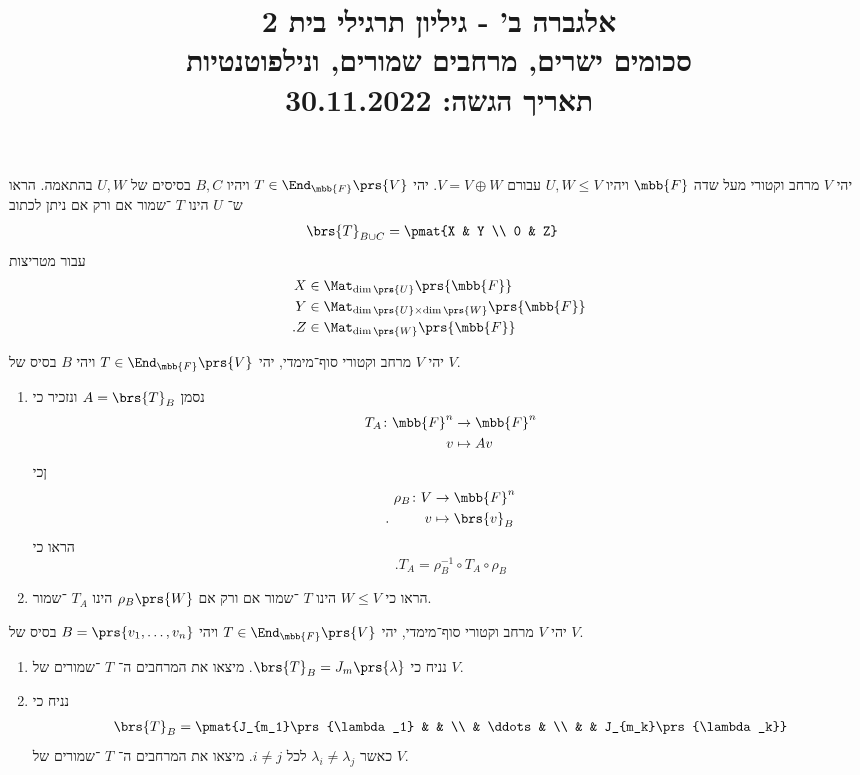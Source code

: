 \documentclass[a4paper,10pt,twoside,openany]{article}
\title{
אלגברה ב' - גיליון תרגילי בית 2 \\
סכומים ישרים, מרחבים שמורים, ונילפוטנטיות
\\
\vspace{1cm}
\large{תאריך הגשה: 30.11.2022}
}
\date{}
\begin{document}
\maketitle

\begin{exercise}
יהי
$V$
מרחב וקטורי מעל שדה
$\mbb{F}$
ויהיו
$U,W \leq V$
עבורם
$V = V \oplus W$.
יהי
$T \in \End_{\mbb{F}}\prs{V}$
ויהיו
$B,C$
בסיסים של
$U,W$
בהתאמה.
הראו ש־%
$U$
הינו
$T$%
־שמור אם ורק אם ניתן לכתוב
\begin{align*}
\brs{T}_{B \cup C} &= \pmat{X & Y \\ 0 & Z}
\end{align*}
עבור מטריצות
\begin{align*}
X &\in \Mat_{\dim\prs{U}}\prs{\mbb{F}} \\
Y &\in \Mat_{\dim\prs{U} \times \dim\prs{W}}\prs{\mbb{F}} \\
\text{.} Z &\in \Mat_{\dim\prs{W}}\prs{\mbb{F}}
\end{align*}
\end{exercise}

\begin{exercise}
יהי
$V$
מרחב וקטורי סוף־מימדי, יהי
$T \in \End_{\mbb{F}}\prs{V}$
ויהי
$B$
בסיס של
$V$.

\begin{enumerate}
\item נסמן
$A = \brs{T}_B$
ונזכיר כי
\begin{align*}
T_A \colon \mbb{F}^n &\to \mbb{F}^n \\
v &\mapsto Av
\end{align*}
ןכי
\begin{align*}
\rho_B \colon V &\to \mbb{F}^n \\
\text{.} \hphantom{lalala} v &\mapsto \brs{v}_B
\end{align*}
הראו כי
\[\text{.} T_A = \rho_B^{-1} \circ T_A \circ \rho_B\]

\item
הראו כי
$W \leq V$
הינו
$T$%
־שמור אם ורק אם
$\rho_B\prs{W}$
הינו
$T_A$%
־שמור.
\end{enumerate}
\end{exercise}

\begin{exercise}
יהי
$V$
מרחב וקטורי סוף־מימדי, יהי
$T \in \End_{\mbb{F}}\prs{V}$
ויהי
$B = \prs{v_1, \ldots, v_n}$
בסיס של
$V$.
\begin{enumerate}
\item נניח כי
$\brs{T}_B = J_m\prs{\lambda}$.
מיצאו את המרחבים ה־%
$T$%
־שמורים של
$V$.

\item נניח כי
\begin{align*}
\brs{T}_B = \pmat{J_{m_1}\prs{\lambda_1} & & \\ & \ddots & \\ & & J_{m_k}\prs{\lambda_k}}
\end{align*}
כאשר
$\lambda_i \neq \lambda_j$
לכל
$i \neq j$.
מיצאו את המרחבים ה־%
$T$%
־שמורים של
$V$.
\end{enumerate}
\end{exercise}
\end{document}
